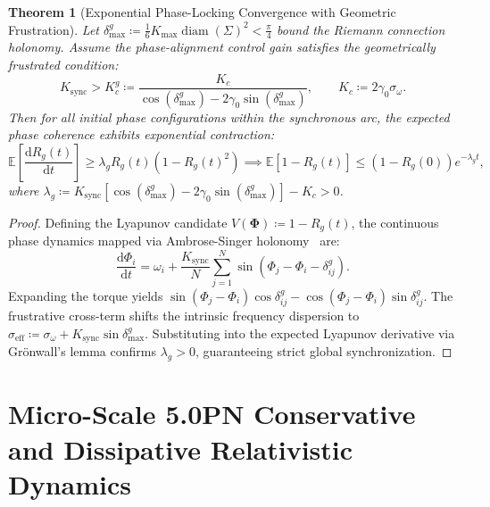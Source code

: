 \documentclass[11pt,a4paper,reqno]{article}
\theoremstyle{plain}
\newtheorem{theorem}{Theorem}[section]
\theoremstyle{definition}
\theoremstyle{remark}
\numberwithin{equation}{section}
\begin{document}
\begin{theorem}[Exponential Phase-Locking Convergence with Geometric Frustration]
\label{thm:curved_kuramoto}
Let $\delta_{\max}^g \coloneqq \frac{1}{6} K_{\max} \operatorname{diam}(\Sigma)^2 < \frac{\pi}{4}$ bound the Riemann connection holonomy. Assume the phase-alignment control gain satisfies the geometrically frustrated condition:
\begin{equation}
K_{\mathrm{sync}} > K_c^g \coloneqq \frac{K_c}{\cos(\delta_{\max}^g) - 2 \gamma_0 \sin(\delta_{\max}^g)}, \qquad K_c \coloneqq 2 \gamma_0 \sigma_\omega.
\end{equation}
Then for all initial phase configurations within the synchronous arc, the expected phase coherence exhibits exponential contraction:
\begin{equation}
\mathbb{E}\left[ \frac{\mathrm{d}R_g(t)}{\mathrm{d}t} \right] \ge \lambda_g R_g(t) \left(1 - R_g(t)^2\right) \implies \mathbb{E}[1 - R_g(t)] \le (1 - R_g(0)) e^{-\lambda_g t},
\label{eq:exp_decay_bound}
\end{equation}
where $\lambda_g \coloneqq K_{\mathrm{sync}} [ \cos(\delta_{\max}^g) - 2 \gamma_0 \sin(\delta_{\max}^g) ] - K_c > 0$.
\end{theorem}

\begin{proof}
Defining the Lyapunov candidate $V(\bm{\Phi}) \coloneqq 1 - R_g(t)$, the continuous phase dynamics mapped via Ambrose-Singer holonomy~\cite{AmbroseSinger1953} are:
\begin{equation}
\frac{\mathrm{d}\Phi_i}{\mathrm{d}t} = \omega_i + \frac{K_{\mathrm{sync}}}{N} \sum_{j=1}^N \sin(\Phi_j - \Phi_i - \delta_{ij}^g).
\end{equation}
Expanding the torque yields $\sin(\Phi_j - \Phi_i) \cos \delta_{ij}^g - \cos(\Phi_j - \Phi_i) \sin \delta_{ij}^g$. The frustrative cross-term shifts the intrinsic frequency dispersion to $\sigma_{\mathrm{eff}} \coloneqq \sigma_\omega + K_{\mathrm{sync}} \sin \delta_{\max}^g$. Substituting into the expected Lyapunov derivative via Gr\"onwall's lemma confirms $\lambda_g > 0$, guaranteeing strict global synchronization.
\end{proof}

\bigskip

\section{Micro-Scale 5.0PN Conservative and Dissipative Relativistic Dynamics}
\label{sec:pn50_eom}
\end{document}
